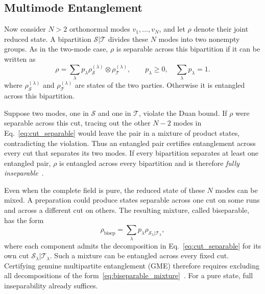 \documentclass[%
 reprint,
 amsmath,amssymb,
 aps,
pra,
twocolumn,
]{revtex4-2}
\begin{document}
\subsection{Multimode Entanglement}
\label{sec:multimode_certification}

Now consider $N>2$ orthonormal modes $v_1,\ldots,v_N$, and let $\rho$ denote their joint reduced state. A bipartition $\mathcal S|\mathcal T$ divides these $N$ modes into two nonempty groups. As in the two-mode case, $\rho$ is separable across this bipartition if it can be written as
\begin{equation}
    \rho=\sum_\lambda p_\lambda
        \rho_\mathcal{S}^{(\lambda)}\otimes\rho_\mathcal{T}^{(\lambda)},
    \qquad p_\lambda\ge0,\quad \sum_\lambda p_\lambda=1.
    \label{eq:cut_separable}
\end{equation}
where $\rho_\mathcal{S}^{(\lambda)}$ and $\rho_\mathcal{T}^{(\lambda)}$ are states of the two parties. Otherwise it is entangled across this bipartition.

Suppose two modes, one in $\mathcal S$ and one in $\mathcal T$, violate the Duan bound. If $\rho$ were separable across this cut, tracing out the other $N-2$ modes in Eq.~\eqref{eq:cut_separable} would leave the pair in a mixture of product states, contradicting the violation. Thus an entangled pair certifies entanglement across every cut that separates its two modes. If every bipartition separates at least one entangled pair, $\rho$ is entangled across every bipartition and is therefore \emph{fully inseparable}~\cite{vanloock2003detecting}.

Even when the complete field is pure, the reduced state of these $N$ modes can be mixed. A preparation could produce states separable across one cut on some runs and across a different cut on others. The resulting mixture, called biseparable, has the form
\begin{equation}
    \rho_{\mathrm{bisep}}=\sum_\lambda p_\lambda
        \rho_{\mathcal{S}_\lambda|\mathcal{T}_\lambda},
    \label{eq:biseparable_mixture}
\end{equation}
where each component admits the decomposition in Eq.~\eqref{eq:cut_separable} for its own cut $\mathcal S_\lambda|\mathcal T_\lambda$. Such a mixture can be entangled across every fixed cut. Certifying genuine multipartite entanglement (GME) therefore requires excluding all decompositions of the form~\eqref{eq:biseparable_mixture}~\cite{teh2014criteria}. For a pure state, full inseparability already suffices.
\end{document}
